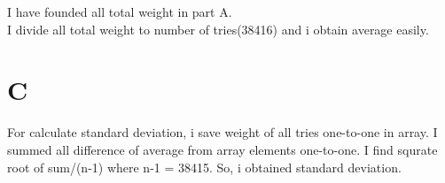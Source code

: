 \documentclass[12pt]{article}
\begin{document}
I have founded all total weight in part A.\\
I divide all total weight to number of tries(38416) and i obtain average easily.\\



\section*{C}

For calculate standard deviation, i save weight of all tries one-to-one in array. I summed all difference of average from array elements one-to-one. I find squrate root of sum/(n-1) where n-1 = 38415. So, i obtained standard deviation. 
\end{document}
